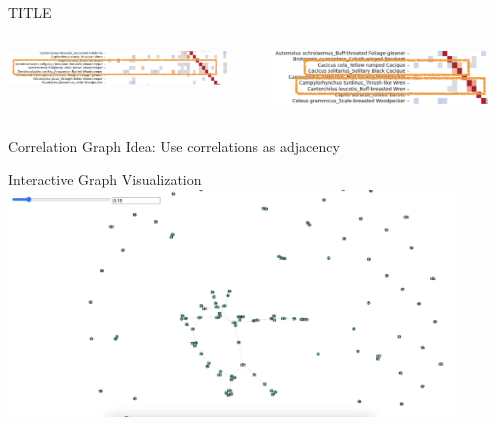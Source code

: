 \begin{frame}{TITLE}
    \begin{columns}
        \begin{column}{0.5\textwidth}
            \centering
            \includegraphics[height=0.9\textheight,width=0.9\textwidth,keepaspectratio]{images/sim1.png}
        \end{column}
        \begin{column}{0.5\textwidth}
            \centering
            \includegraphics[height=0.9\textheight,width=0.9\textwidth,keepaspectratio]{images/sim2.png}
        \end{column}
    \end{columns}
\end{frame}

\begin{frame}{Correlation Graph}
    \centering Idea: Use correlations as adjacency
\end{frame}

\begin{frame}{Interactive Graph Visualization}
    \includegraphics[height=0.9\textheight, width=0.9\textwidth]{images/asid_corr_graphvis.png}
\end{frame}

